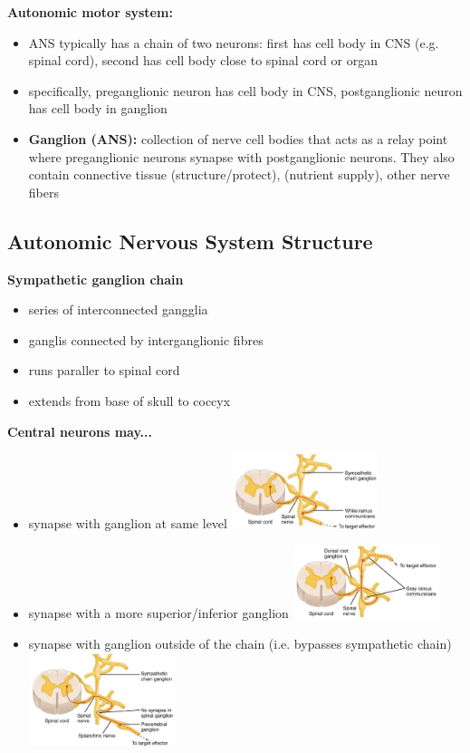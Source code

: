 \documentclass[11pt,fleqn]{book}
\begin{document}
\textbf{Autonomic motor system:} 
\begin{itemize}
    \item ANS typically has a chain of two neurons: first has cell body in CNS (e.g. spinal cord), second has cell body close to spinal cord or organ
    \item specifically, preganglionic neuron has cell body in CNS, postganglionic neuron has cell body in ganglion
    \item \textbf{Ganglion (ANS):} collection of nerve cell bodies that acts as a relay point where preganglionic neurons synapse with postganglionic neurons. They also contain connective tissue (structure/protect), (nutrient supply), other nerve fibers
\end{itemize}

\subsection{Autonomic Nervous System Structure}
\textbf{Sympathetic ganglion chain}
\begin{itemize}
    \item series of interconnected gangglia
    \item ganglis connected by interganglionic fibres
    \item runs paraller to spinal cord
    \item extends from base of skull to coccyx
\end{itemize}

\textbf{Central neurons may...}
\begin{itemize}
    \item synapse with ganglion at same level \includegraphics[width=120pt]{Pictures/Screenshot 2024-03-06 202747.png}
    \item synapse with a more superior/inferior ganglion \includegraphics[width=120pt]{Pictures/Screenshot 2024-03-06 202752.png}
    \item synapse with ganglion outside of the chain (i.e. bypasses sympathetic chain) \includegraphics[width=120pt]{Pictures/Screenshot 2024-03-06 202757.png}
\end{itemize}
\end{document}
